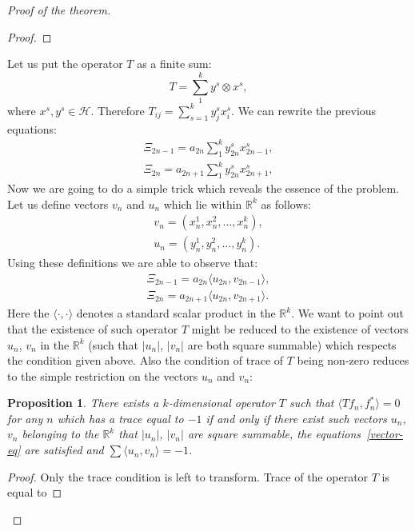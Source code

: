 \documentclass[12pt]{article}
\renewcommand{\cal}[1]{\mathcal{#1}}
\newtheorem{prop}{Proposition}
\theoremstyle{definition}
\numberwithin{remark}{section}
\numberwithin{theorem}{section}
\numberwithin{prop}{section}
\numberwithin{equation}{section}
\numberwithin{lemma}{section}
\numberwithin{prop_under_lemma}{lemma}
\begin{document}
\begin{proof}[Proof of the theorem]
\begin{proof}
        \end{proof}
        Let us put the operator $T$ as a finite sum:
        $$
            T = \sum_1^k y^s \otimes x^s,
        $$
        where $x^s, y^s \in \cal{H}$.
        Therefore $T_{ij} = \sum_{s=1}^k {y^s_j x^s_i}$. We can rewrite the previous equations:
        \begin{align*}
            \Xi_{2n-1} = a_{2n} \sum_1^k y^s_{2n} x^s_{2n - 1},\\
            \Xi_{2n} = a_{2n + 1} \sum_1^k y^s_{2n} x^s_{2n + 1},
        \end{align*}
        Now we are going to do a simple trick which reveals the essence of the problem.
        Let us define vectors $v_n$ and $u_n$ which lie within $\mathbb{R}^k$ as follows:
        \begin{align*}
            v_n = (x^1_n, x^2_n, \dots ,x^k_n),\\
            u_n = (y^1_n, y^2_n, \dots ,y^k_n). 
        \end{align*}
        Using these definitions we are able to observe that:
        \begin{align}
            \label{vector-eq}
            \Xi_{2n-1} = a_{2n} \langle u_{2n}, v_{2n - 1}\rangle,\\
            \Xi_{2n} = a_{2n + 1} \langle u_{2n}, v_{2n + 1}\rangle.
        \end{align}
        Here the $\langle\cdot, \cdot\rangle$ denotes a standard scalar product in the $\mathbb{R}^k$.
        We want to point out that the existence of such operator $T$
        might be reduced to the existence of vectors $u_n$, $v_n$ in the $\mathbb{R}^k$ (such that $|u_n|$, $|v_n|$ are both square summable) which respects the condition given above.
        Also the condition of trace of $T$ being non-zero reduces to the simple restriction on the vectors $u_n$ and $v_n$:
        \begin{prop}
            There exists a $k$-dimensional operator $T$ such that $\langle Tf_n, f_n^*\rangle  = 0$ for any $n$
            which has a trace equal to $-1$ if and only if there exist such vectors $u_n$, $v_n$ belonging to the
            $\mathbb{R}^k$ that $|u_n|$, $|v_n|$ are square summable, the equations~\eqref{vector-eq} are satisfied and
            $\sum \langle u_n,v_n \rangle = -1$. 
        \end{prop}
        \begin{proof}
            Only the trace condition is left to transform.
            Trace of the operator $T$ is equal to

\end{proof}
\end{proof}
\end{document}
